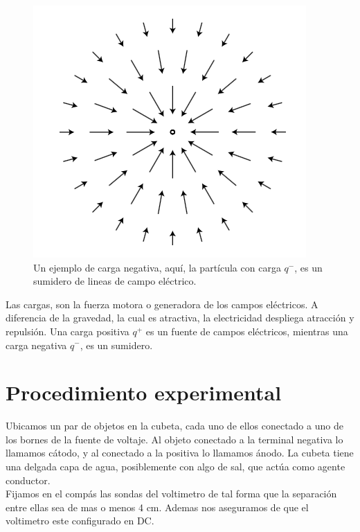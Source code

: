 \documentclass[DIV=calc, paper=a4, fontsize=11pt, twocolumn, spanish]{scrartcl}	 %
\begin{document}
\begin{figure}[htbp]
\centering
	\includegraphics[scale=0.8]{data/img/field}
	\caption{Un ejemplo de carga negativa, aquí, la partícula con carga $q^-$, es un sumidero de lineas de campo eléctrico.}
\end{figure}

Las cargas, son la fuerza motora o generadora de los campos eléctricos. A diferencia de la gravedad, la cual es atractiva, la electricidad despliega atracción y repulsión. Una carga positiva $q^+$ es un fuente de campos eléctricos, mientras una carga negativa $q^-$, es un sumidero.


\section*{Procedimiento experimental}

Ubicamos un par de objetos en la cubeta, cada uno de ellos conectado a uno de los bornes de la fuente de voltaje. Al objeto conectado a la terminal negativa lo llamamos cátodo, y al conectado a la positiva lo llamamos ánodo. La cubeta tiene una delgada capa de agua, posiblemente con algo de sal, que actúa como agente conductor.\\

Fijamos en el compás las sondas del voltimetro de tal forma que la separación entre ellas sea de mas o menos 4 cm. Ademas nos aseguramos de que el voltimetro este configurado en DC.\\
\end{document}
